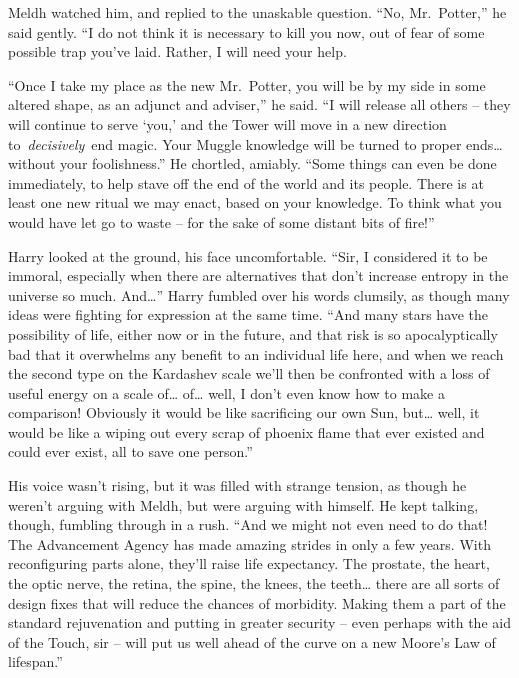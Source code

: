 Meldh watched him, and replied to the unaskable question. ``No,
Mr.~Potter,'' he said gently. ``I do not think it is necessary to kill
you now, out of fear of some possible trap you've laid. Rather, I will
need your help.

``Once I take my place as the new Mr.~Potter, you will be by my side in
some altered shape, as an adjunct and adviser,'' he said. ``I will
release all others -- they will continue to serve `you,' and the Tower
will move in a new direction to~\emph{decisively}~end magic. Your Muggle
knowledge will be turned to proper ends\ldots{} without your
foolishness.'' He chortled, amiably. ``Some things can even be done
immediately, to help stave off the end of the world and its people.
There is at least one new ritual we may enact, based on your knowledge.
To think what you would have let go to waste -- for the sake of some
distant bits of fire!''

Harry looked at the ground, his face uncomfortable. ``Sir, I considered
it to be immoral, especially when there are alternatives that don't
increase entropy in the universe so much. And\ldots{}'' Harry fumbled
over his words clumsily, as though many ideas were fighting for
expression at the same time. ``And many stars have the possibility of
life, either now or in the future, and that risk is so apocalyptically
bad that it overwhelms any benefit to an individual life here, and when
we reach the second type on the Kardashev scale we'll then be confronted
with a loss of useful energy on a scale of\ldots{} of\ldots{} well, I
don't even know how to make a comparison! Obviously it would be like
sacrificing our own Sun, but\ldots{} well, it would be like a wiping out
every scrap of phoenix flame that ever existed and could ever exist, all
to save one person.''

His voice wasn't rising, but it was filled with strange tension, as
though he weren't arguing with Meldh, but were arguing with himself. He
kept talking, though, fumbling through in a rush. ``And we might not
even need to do that! The Advancement Agency has made amazing strides in
only a few years. With reconfiguring parts alone, they'll raise life
expectancy. The prostate, the heart, the optic nerve, the retina, the
spine, the knees, the teeth\ldots{} there are all sorts of design fixes
that will reduce the chances of morbidity. Making them a part of the
standard rejuvenation and putting in greater security -- even perhaps
with the aid of the Touch, sir -- will put us well ahead of the curve on
a new Moore's Law of lifespan.''

